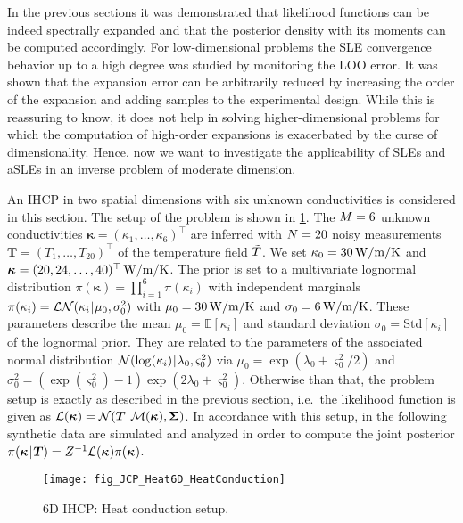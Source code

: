 In the previous sections it was demonstrated that likelihood functions can be indeed spectrally expanded and that the posterior density with its moments can be computed accordingly.
For low-dimensional problems the SLE convergence behavior up to a high degree was studied by monitoring the LOO error.
It was shown that the expansion error can be arbitrarily reduced by increasing the order of the expansion and adding samples to the experimental design.
While this is reassuring to know, it does not help in solving higher-dimensional problems
for which the computation of high-order expansions is exacerbated by the curse of dimensionality.
Hence, now we want to investigate the applicability of SLEs and aSLEs in an inverse problem of moderate dimension.
\par %
An IHCP in two spatial dimensions with six unknown conductivities is considered in this section.
The setup of the problem is shown in \cref{fig:JCP:Thermal:HeatConduction}.
The \(M = 6\) unknown conductivities \(\bm{\kappa} = (\kappa_1,\ldots,\kappa_6)^\top\) are inferred
with \(N = 20\) noisy measurements \(\bm{T} = (T_{1},\ldots,T_{20})^\top\) of the temperature field \(\tilde{T}\).
We set \(\kappa_0 = \unit[30]{W/m/K}\) and \(\bm{\kappa} = \unit[(20,24,\ldots,40)^\top]{W/m/K}\).
The prior is set to a multivariate lognormal distribution \(\pi(\bm{\kappa}) = \prod_{i=1}^6 \pi(\kappa_i)\) with independent marginals
\(\pi(\kappa_i) = \mathcal{LN}( \kappa_i {\:\!}|{\:\!} \mu_0,\sigma_0^2)\) with \(\mu_0 = \unit[30]{W/m/K}\) and \(\sigma_0 = \unit[6]{W/m/K}\).
These parameters describe the mean \(\mu_0 = \mathds{E}[\kappa_i]\) and standard deviation \(\sigma_0 = \mathrm{Std}[\kappa_i]\) of the lognormal prior.
They are related to the parameters of the associated normal distribution \(\mathcal{N}( \log(\kappa_i) {\:\!}|{\:\!} \lambda_0,\varsigma_0^2)\)
via \(\mu_0 = \exp(\lambda_0 + \varsigma_0^2 / 2)\) and \(\sigma_0^2 = (\exp(\varsigma_0^2) - 1) \exp(2 \lambda_0 + \varsigma_0^2)\).
Otherwise than that, the problem setup is exactly as described in the previous section,
i.e.\ the likelihood function is given as \(\mathcal{L}(\bm{\kappa}) = \mathcal{N}(\bm{T} {\:\!}|{\:\!} \mathcal{M}(\bm{\kappa}),\bm{\Sigma})\).
In accordance with this setup, in the following synthetic data are simulated and analyzed in order to compute
the joint posterior \(\pi(\bm{\kappa} {\:\!}|{\:\!} \bm{T}) = Z^{-1} \mathcal{L}(\bm{\kappa}) \pi(\bm{\kappa})\).
\begin{figure}[htbp]
  \centering
  \texttt{[image: fig\_JCP\_Heat6D\_HeatConduction]}
  \caption[6D IHCP: Heat conduction setup]{6D IHCP: Heat conduction setup.}
  \label{fig:JCP:Thermal:HeatConduction}
\end{figure}

